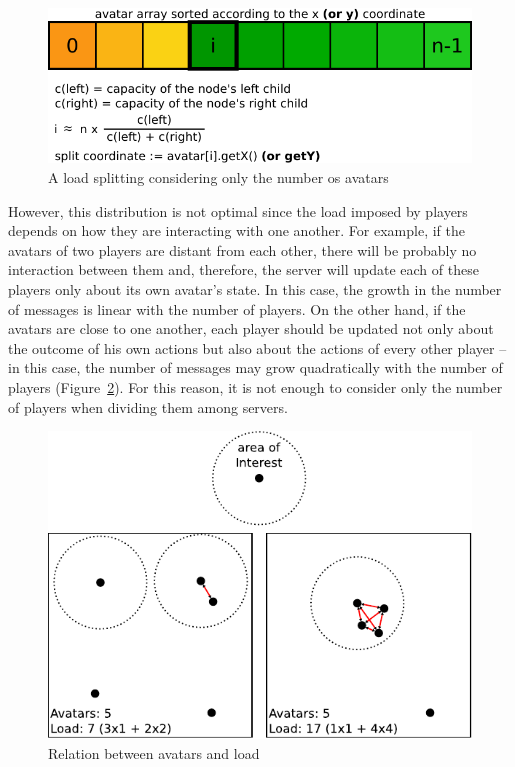 \documentclass[acmjacm]{acmtrans2m}
\newcommand{\figurecaption}{Figure}
\begin{document}
\begin{figure}
  \centering
  \includegraphics[width=0.8\linewidth]{images/vector}
  \caption{A load splitting considering only the number os avatars}
  \label{fig:vector}
\end{figure}

However, this distribution is not optimal since the load imposed by players depends on how they are interacting with one another. For example, if the avatars of two players are distant from each other, there will be probably no interaction between them and, therefore, the server will update each of these players only about its own avatar's state. In this case, the growth in the number of messages is linear with the number of players. On the other hand, if the avatars are close to one another, each player should be updated not only about the outcome of his own actions but also about the actions of every other player -- in this case, the number of messages may grow quadratically with the number of players \mbox{(\figurecaption{} \ref{fig:load})}. For this reason, it is not enough to consider only the number of players when dividing them among servers.

\begin{figure}
  \centering
  \includegraphics[width=0.8\linewidth]{images/carga}
  \caption{Relation between avatars and load}
  \label{fig:load}
\end{figure}
\end{document}
